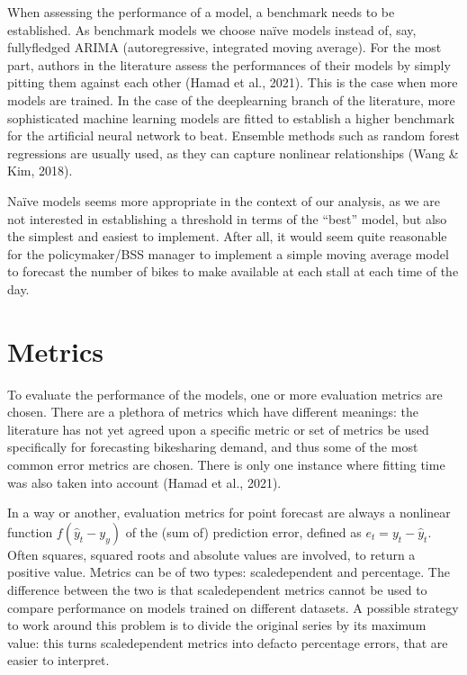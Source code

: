 \documentclass[letterpaper,10pt,english]{jupyterBook}
\begin{document}
\sphinxAtStartPar
When assessing the performance of a model, a benchmark needs to be established. As benchmark models we choose naïve models instead of, say, fully\sphinxhyphen{}fledged ARIMA (auto\sphinxhyphen{}regressive, integrated moving average). For the most part, authors in the literature assess the performances of their models by simply pitting them against each other (Hamad et al., 2021). This is the case when more models are trained. In the case of the deep\sphinxhyphen{}learning branch of the literature, more sophisticated machine learning models are fitted to establish a higher benchmark for the artificial neural network to beat. Ensemble methods such as random forest regressions are usually used, as they can capture non\sphinxhyphen{}linear relationships  (Wang \& Kim, 2018).

\sphinxAtStartPar
Naïve models seems more appropriate in the context of our analysis, as we are not interested in establishing a threshold in terms of the “best” model, but also the simplest and easiest to implement. After all, it would seem quite reasonable for the policymaker/BSS manager to implement a simple moving average model to forecast the number of bikes to make available at each stall at each time of the day.


\section{Metrics}
\label{\detokenize{06-forecasting:metrics}}
\sphinxAtStartPar
To evaluate the performance of the models, one or more evaluation metrics are chosen. There are a plethora of metrics which have different meanings: the literature has not yet agreed upon a specific metric or set of metrics be used specifically for forecasting bike\sphinxhyphen{}sharing demand, and thus some of the most common error metrics are chosen. There is only one instance where fitting time was also taken into account (Hamad et al., 2021).

\sphinxAtStartPar
In a way or another, evaluation metrics for point forecast are always a non\sphinxhyphen{}linear function \(f(\hat{y}_t - y_y)\) of
the (sum of) prediction error, defined as \(e_{t} = y_{t} - \hat{y}_{t}\). Often squares, squared roots and absolute values are involved, to return a positive value. Metrics can be of two types: scale\sphinxhyphen{}dependent and percentage. The difference between the two is that scale\sphinxhyphen{}dependent metrics cannot be used to compare performance on models trained on different datasets. A possible strategy to work around this problem is to divide the original series by its maximum value: this turns scale\sphinxhyphen{}dependent metrics into de\sphinxhyphen{}facto percentage errors, that are easier to interpret.
\end{document}
